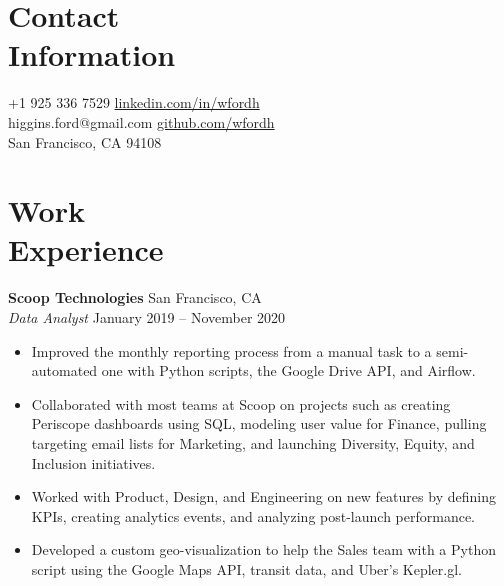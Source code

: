 \documentclass[line, margin]{res}
\begin{document}

\begin{resume}
	
	
\section{Contact \\ Information}
	+1 925 336 7529       \hfill \href{https://linkedin.com/in/wfordh/}{linkedin.com/in/wfordh} \\
	\noindent higgins.ford@gmail.com  \hfill \href{https://github.com/wfordh}{github.com/wfordh} \\
	\noindent San Francisco, CA 94108
	

\section{Work\\Experience}
	\textbf{Scoop Technologies} \hfill{San Francisco, CA} \vspace{1 mm}\\\vspace{0.5mm}%
	\textsl{Data Analyst} \hfill{January 2019 -- November 2020}\
	\begin{itemize}
		\item Improved the monthly reporting process from a manual task to a semi-automated one with Python scripts, the Google Drive API, and Airflow.
		\item Collaborated with most teams at Scoop on projects such as creating Periscope dashboards using SQL, modeling user value for Finance, pulling targeting email lists for Marketing, and launching Diversity, Equity, and Inclusion initiatives.
		\item Worked with Product, Design, and Engineering on new features by defining KPIs, creating analytics events, and analyzing post-launch performance.
		\item Developed a custom geo-visualization to help the Sales team with a Python script using the Google Maps API, transit data, and Uber's Kepler.gl.
	\end{itemize}\
	

\end{resume}
\end{document}
